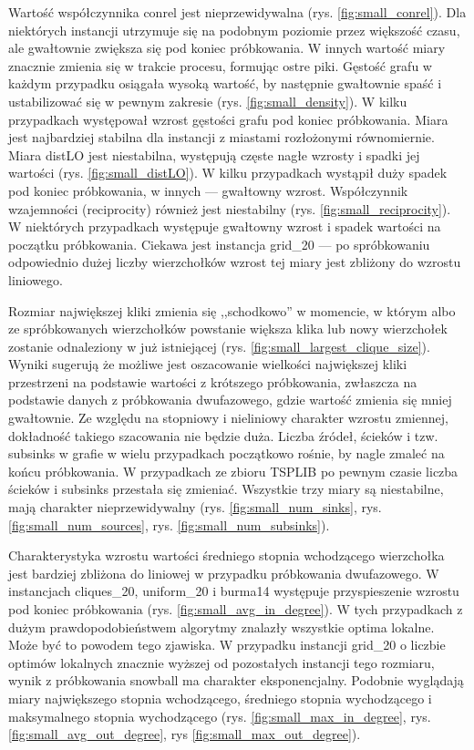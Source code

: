 Wartość współczynnika conrel jest nieprzewidywalna (rys. \ref{fig:small_conrel}).
Dla niektórych instancji utrzymuje się na podobnym poziomie przez większość czasu,
ale gwałtownie zwiększa się pod koniec próbkowania.
W innych wartość miary znacznie zmienia się w trakcie procesu, formując ostre piki.
Gęstość grafu w każdym przypadku osiągała wysoką wartość, by następnie gwałtownie spaść i ustabilizować się w pewnym zakresie (rys. \ref{fig:small_density}).
W kilku przypadkach występował wzrost gęstości grafu pod koniec próbkowania.
Miara jest najbardziej stabilna dla instancji z miastami rozłożonymi równomiernie.
Miara distLO jest niestabilna, występują częste nagłe wzrosty i spadki jej wartości (rys. \ref{fig:small_distLO}).
W kilku przypadkach wystąpił duży spadek pod koniec próbkowania, w innych --- gwałtowny wzrost.
Współczynnik wzajemności (reciprocity) również jest niestabilny (rys. \ref{fig:small_reciprocity}).
W niektórych przypadkach występuje gwałtowny wzrost i spadek wartości na początku próbkowania.
Ciekawa jest instancja grid\_20 --- po spróbkowaniu odpowiednio dużej liczby wierzchołków
wzrost tej miary jest zbliżony do wzrostu liniowego.

Rozmiar największej kliki zmienia się ,,schodkowo'' w momencie, w którym albo ze spróbkowanych wierzchołków
powstanie większa klika lub nowy wierzchołek zostanie odnaleziony w już istniejącej (rys. \ref{fig:small_largest_clique_size}).
Wyniki sugerują że możliwe jest oszacowanie wielkości największej kliki przestrzeni na podstawie wartości
z krótszego próbkowania, zwłaszcza na podstawie danych z próbkowania dwufazowego, gdzie
wartość zmienia się mniej gwałtownie. Ze względu na stopniowy i nieliniowy charakter wzrostu zmiennej,
dokładność takiego szacowania nie będzie duża.
Liczba źródeł, ścieków i tzw. subsinks w grafie w wielu przypadkach początkowo rośnie, by nagle zmaleć na końcu próbkowania.
W przypadkach ze zbioru TSPLIB po pewnym czasie liczba ścieków i subsinks przestała się zmieniać.
Wszystkie trzy miary są niestabilne, mają charakter nieprzewidywalny (rys. \ref{fig:small_num_sinks}, rys. \ref{fig:small_num_sources}, rys. \ref{fig:small_num_subsinks}).

Charakterystyka wzrostu wartości średniego stopnia wchodzącego wierzchołka jest bardziej zbliżona do liniowej
w przypadku próbkowania dwufazowego. W instancjach cliques\_20, uniform\_20 i burma14 występuje
przyspieszenie wzrostu pod koniec próbkowania (rys. \ref{fig:small_avg_in_degree}).
W tych przypadkach z dużym prawdopodobieństwem algorytmy znalazły wszystkie optima lokalne.
Może być to powodem tego zjawiska.
W przypadku instancji grid\_20 o liczbie optimów lokalnych znacznie wyższej od pozostałych instancji tego rozmiaru,
wynik z próbkowania snowball ma charakter eksponencjalny.
Podobnie wyglądają miary największego stopnia wchodzącego, średniego stopnia wychodzącego i maksymalnego stopnia wychodzącego
(rys. \ref{fig:small_max_in_degree}, rys. \ref{fig:small_avg_out_degree}, rys \ref{fig:small_max_out_degree}).


